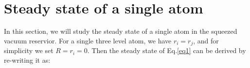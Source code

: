 \documentclass[aps,showpacs,twocolumn,twoside,groupedaddress]{revtex4}
\begin{document}
\section{Steady state of a single atom}
In this section, we will study the steady state of a single atom in the squeezed vacuum reservior. For a single three level atom, we have $r_i=r_j$, and for simplicity we set $R=r_i=0$. Then the steady state of Eq.\eqref{eq1} can be derived by re-writing it as:
\end{document}
